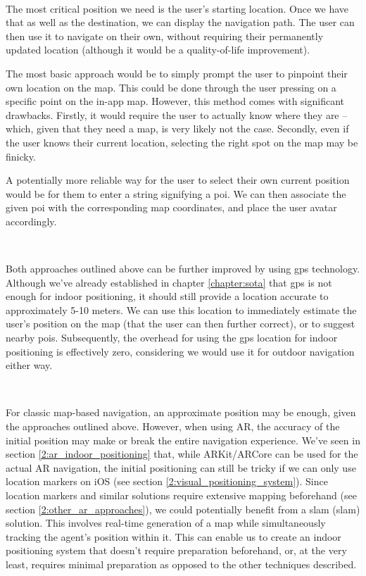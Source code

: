         ~
        
        The most critical position we need is the user's starting location. Once we have that as well as the destination, we can display the navigation path. The user can then use it to navigate on their own, without requiring their permanently updated location (although it would be a quality-of-life improvement).
        
        The most basic approach would be to simply prompt the user to pinpoint their own location on the map. This could be done through the user pressing on a specific point on the in-app map. However, this method comes with significant drawbacks. Firstly, it would require the user to actually know where they are -- which, given that they need a map, is very likely not the case. Secondly, even if the user knows their current location, selecting the right spot on the map may be finicky.
        
        A potentially more reliable way for the user to select their own current position would be for them to enter a string signifying a \acrlong{poi}. We can then associate the given \acrshort{poi} with the corresponding map coordinates, and place the user avatar accordingly.
        
        ~
        
        Both approaches outlined above can be further improved by using \gls{gps} technology. Although we've already established in chapter \ref{chapter:sota} that \gls{gps} is not enough for indoor positioning, it should still provide a location accurate to approximately 5-10 meters. We can use this location to immediately estimate the user's position on the map (that the user can then further correct), or to suggest nearby \acrshort{poi}s. Subsequently, the overhead for using the \gls{gps} location for indoor positioning is effectively zero, considering we would  use it for outdoor navigation either way.
        
        ~
        
        For classic map-based navigation, an approximate position may be enough, given the approaches outlined above. However, when using AR, the accuracy of the initial position may make or break the entire navigation experience. We've seen in section \ref{2:ar_indoor_positioning} that, while ARKit/ARCore can be used for the actual AR navigation, the initial positioning can still be tricky if we can only use location markers on iOS (see section \ref{2:visual_positioning_system}).  Since location markers and similar solutions require extensive mapping beforehand (see section  \ref{2:other_ar_approaches}), we could potentially benefit from a \acrshort{slam} (\acrlong{slam}) solution. This involves real-time generation of a map while simultaneously tracking the agent’s position within it. This can enable us to create an indoor positioning system that doesn’t require preparation beforehand, or, at the very least, requires minimal preparation as opposed to the other techniques described.
        
